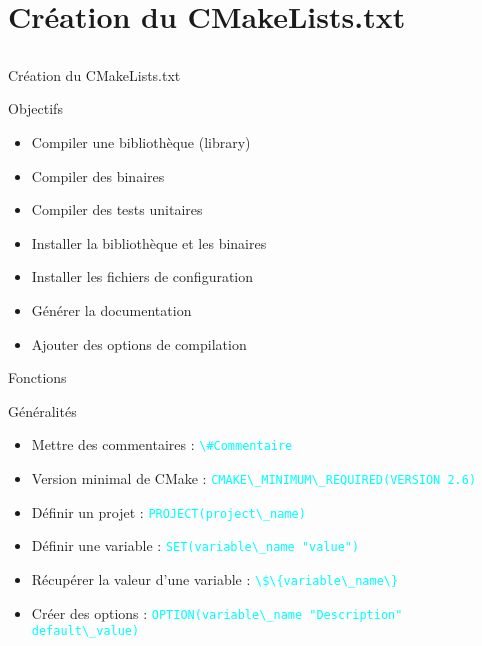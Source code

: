 \documentclass{beamer}
\begin{document}
\section{Création du CMakeLists.txt}
\subsection{}
\begin{frame}{Création du CMakeLists.txt}
  \begin{exampleblock}{Objectifs}
    \begin{itemize}
    \item Compiler une bibliothèque (library)
    \item Compiler des binaires
    \item Compiler des tests unitaires
    \end{itemize}
  \end{exampleblock}
  \pause
  \begin{exampleblock}{}
    \begin{itemize}
    \item Installer la bibliothèque et les binaires
    \item Installer les fichiers de configuration
    \item Générer la documentation
    \item Ajouter des options de compilation
    \end{itemize}
  \end{exampleblock}
\end{frame}

\begin{frame}[fragile]{Fonctions}
  \begin{block}{Généralités}
    \begin{itemize}
    \item Mettre des commentaires :\linebreak
      \textcolor{cyan}{\verb?\#Commentaire ?}
    \item Version minimal de CMake :\linebreak
      \textcolor{cyan}{\verb?CMAKE\_MINIMUM\_REQUIRED(VERSION 2.6)?}
    \item Définir un projet :\linebreak
      \textcolor{cyan}{\verb?PROJECT(project\_name)?}
    \item Définir une variable :\linebreak
      \textcolor{cyan}{\verb?SET(variable\_name "value")?}
    \item Récupérer la valeur d'une variable :\linebreak
      \textcolor{cyan}{\verb?\$\{variable\_name\}?}
    \item Créer des options :\linebreak
      \textcolor{cyan}{\verb?OPTION(variable\_name "Description" default\_value)?}
    \end{itemize}
  \end{block}
\end{frame}
\end{document}
